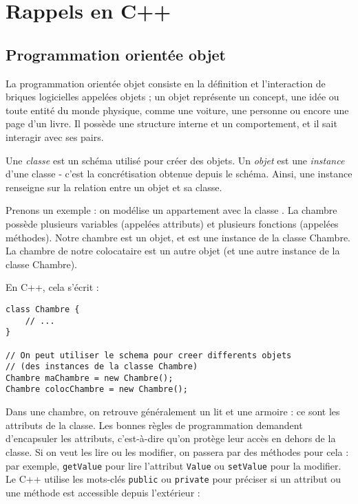 \documentclass[abstracton]{scrartcl}
\begin{document}
\lstset{language=C++}




\section{Rappels en C++}
\label{sec:rappels}


\subsection{Programmation orientée objet}
La programmation orientée objet consiste en la définition et l'interaction de briques logicielles appelées objets ; un objet représente un concept, une idée ou toute entité du monde physique, comme une voiture, une personne ou encore une page d'un livre. Il possède une structure interne et un comportement, et il sait interagir avec ses pairs.

Une \emph{classe} est un schéma utilisé pour créer des objets. Un \emph{objet} est une \emph{instance} d'une classe - c'est la concrétisation obtenue depuis le schéma. Ainsi, une instance renseigne sur la relation entre un objet et sa classe.

Prenons un exemple : on modélise un appartement avec la classe . La chambre possède plusieurs variables (appelées attributs) et plusieurs fonctions (appelées méthodes). Notre chambre est un objet, et est une instance de la classe Chambre. La chambre de notre colocataire est un autre objet (et une autre instance de la classe Chambre).

En C++, cela s'écrit :
\begin{lstlisting}
class Chambre {
    // ...
}

// On peut utiliser le schema pour creer differents objets
// (des instances de la classe Chambre)
Chambre maChambre = new Chambre();
Chambre colocChambre = new Chambre();
\end{lstlisting}

Dans une chambre, on retrouve généralement un lit et une armoire : ce sont les attributs de la classe.
Les bonnes règles de programmation demandent d'encapsuler les attributs, c'est-à-dire qu'on protège leur accès  en dehors de la classe.
Si on veut les lire ou les modifier, on passera par des méthodes pour cela : par exemple, \lstinline{getValue} pour lire l'attribut \lstinline{Value} ou \lstinline{setValue} pour la modifier.
Le C++ utilise les mots-clés \lstinline{public} ou \lstinline{private} pour préciser si un attribut ou une méthode est accessible depuis l'extérieur :
\end{document}
